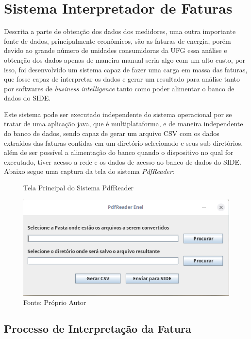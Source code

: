\chapter{Sistema Interpretador de Faturas} 
\label{c:sistema_interpretador_de_faturas}
Descrita a parte de obtenção dos dados dos medidores, uma outra importante fonte de dados, principalmente econômicos, são as faturas de energia, porém devido ao grande número de unidades consumidoras da UFG essa análise e obtenção dos dados apenas de maneira manual seria algo com um alto custo, por isso, foi desenvolvido um sistema capaz de fazer uma carga em massa das faturas, que fosse capaz de interpretar os dados e gerar um resultado para análise tanto por softwares de \textit{business intelligence} tanto como poder alimentar o banco de dados do SIDE.

Este sistema pode ser executado independente do sistema operacional por se tratar de uma aplicação java, que é multiplataforma, e de maneira independente do banco de dados, sendo capaz de gerar um arquivo CSV com os dados extraídos das faturas contidas em um diretório selecionado e seus sub-diretórios, além de ser possível a alimentação do banco quando o dispositivo no qual for executado, tiver acesso a rede e os dados de acesso ao banco de dados do SIDE. Abaixo segue uma captura da tela do sistema \textit{PdfReader}:

\begin{figure}[H]
    \centering
    \caption{Tela Principal do Sistema PdfReader}
\includegraphics[width=\linewidth]{imagens/pdf-reader.png}
    \caption*{Fonte: Próprio Autor}
    \label{fig:diagrama-modelo-dados}
\end{figure}

\newpage
\section{Processo de Interpretação da Fatura}

